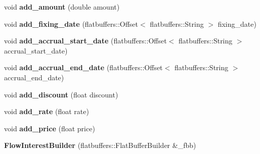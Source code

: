 \begin{DoxyCompactItemize}
\item 
\mbox{\label{structquantra_1_1FlowInterestBuilder_af7424059a3ce706b6b9aae705e19c1f8}} 
void {\bfseries add\+\_\+amount} (double amount)
\item 
\mbox{\label{structquantra_1_1FlowInterestBuilder_a8739b37ec33ac58038658ba76fce014a}} 
void {\bfseries add\+\_\+fixing\+\_\+date} (flatbuffers\+::\+Offset$<$ flatbuffers\+::\+String $>$ fixing\+\_\+date)
\item 
\mbox{\label{structquantra_1_1FlowInterestBuilder_a32c5350de9c05ac7b675d48b8974c9f0}} 
void {\bfseries add\+\_\+accrual\+\_\+start\+\_\+date} (flatbuffers\+::\+Offset$<$ flatbuffers\+::\+String $>$ accrual\+\_\+start\+\_\+date)
\item 
\mbox{\label{structquantra_1_1FlowInterestBuilder_a949f5c0ccf619f7c15e0c6ae6e6acb5b}} 
void {\bfseries add\+\_\+accrual\+\_\+end\+\_\+date} (flatbuffers\+::\+Offset$<$ flatbuffers\+::\+String $>$ accrual\+\_\+end\+\_\+date)
\item 
\mbox{\label{structquantra_1_1FlowInterestBuilder_a1200efd055ba511bdabfbd2d5a9f3e29}} 
void {\bfseries add\+\_\+discount} (float discount)
\item 
\mbox{\label{structquantra_1_1FlowInterestBuilder_a2b35605c938c635d39748ccb58bed5c6}} 
void {\bfseries add\+\_\+rate} (float rate)
\item 
\mbox{\label{structquantra_1_1FlowInterestBuilder_a4ee6a971fb7a04d64b7a5960dedad4df}} 
void {\bfseries add\+\_\+price} (float price)
\item 
\mbox{\label{structquantra_1_1FlowInterestBuilder_a28ec59385c7cf4ba22dcb2244faf6d25}} 
{\bfseries Flow\+Interest\+Builder} (flatbuffers\+::\+Flat\+Buffer\+Builder \&\+\_\+fbb)
\item 
\mbox{\label{structquantra_1_1FlowInterestBuilder_a9f628e0afe32f445bb1b3d5b1738cf9a}} 

\end{DoxyCompactItemize}
